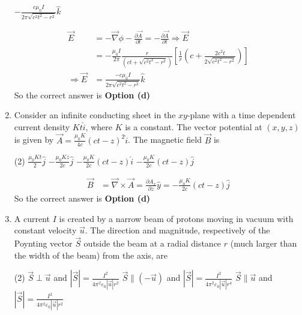 \begin{enumerate}
\begin{tasks}
		\task[\textbf{d.}] $-\frac{c \mu_{0} I}{2 \pi \sqrt{c^{2} t^{2}-r^{2}}} \hat{k}$
	\end{tasks}
\begin{answer}
	\begin{align*}
	\vec{E}&=-\vec{\nabla} \phi-\frac{\partial \vec{A}}{\partial t}=-\frac{\partial \vec{A}}{\partial t} \Rightarrow \vec{E}\\&=-\frac{\mu_{0} I}{2 \pi}\frac{r}{\left(c t+\sqrt{c^{2} t^{2}-r^{2}}\right)}\left[\frac{1}{r}\left(c+\frac{2 c^{2} t}{2 \sqrt{c^{2} t^{2}-r^{2}}}\right)\right]\\
	\Rightarrow \vec{E}&=\frac{-c \mu_{0} I}{2 \pi \sqrt{c^{2} t^{2}-r^{2}}} \hat{k}
	\end{align*}
	So the correct answer is \textbf{Option (d)}
\end{answer}
	\item  Consider an infinite conducting sheet in the $x y$-plane with a time dependent current density $K t \hat{i}$, where $K$ is a constant. The vector potential at $(x, y, z)$ is given by $\vec{A}=\frac{\mu_{0} K}{4 c}(c t-z)^{2} \hat{i}$. The magnetic field $\vec{B}$ is
	{	}
	\begin{tasks}(2)
		\task[\textbf{a.}] $\frac{\mu_{0} K t}{2} \hat{j}$
		\task[\textbf{b.}] $-\frac{\mu_{0} K z}{2 c} \hat{j}$
		\task[\textbf{c.}] $-\frac{\mu_{0} K}{2 c}(c t-z) \hat{i}$
		\task[\textbf{d.}] $-\frac{\mu_{0} K}{2 c}(c t-z) \hat{j}$
	\end{tasks}
\begin{answer}
	\begin{align*}
	\vec{B}&=\vec{\nabla} \times \vec{A}=\frac{\partial A_{x}}{\partial z} \hat{y}=-\frac{\mu_{0} K}{2 c}(c t-z) \hat{j}
	\end{align*}
	So the correct answer is \textbf{Option (d)}
\end{answer}
	\item  A current $I$ is created by a narrow beam of protons moving in vacuum with constant velocity $\vec{u}$. The direction and magnitude, respectively of the Poynting vector $\vec{S}$ outside the beam at a radial distance $r$ (much larger than the width of the beam) from the axis, are
	{	}
	\begin{tasks}(2)
		\task[\textbf{a.}] $\vec{S} \perp \vec{u}$ and $|\vec{S}|=\frac{I^{2}}{4 \pi^{2} \varepsilon_{0}|\vec{u}| r^{2}}$
		\task[\textbf{b.}] $\vec{S} \|(-\vec{u})$ and $|\vec{S}|=\frac{I^{2}}{4 \pi^{2} \varepsilon_{0}|\vec{u}| r^{4}}$
		\task[\textbf{c.}] $\vec{S} \| \vec{u}$ and $|\vec{S}|=\frac{I^{2}}{4 \pi^{2} \varepsilon_{0}|\vec{u}| r^{2}}$

\end{tasks}
\end{enumerate}
